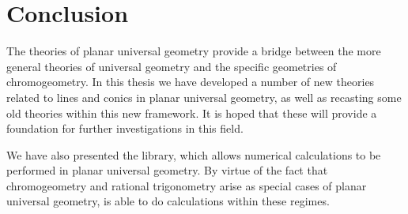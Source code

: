 




\chapter{Conclusion}

The theories of planar universal geometry provide a bridge between the more general theories of universal geometry and the specific geometries of chromogeometry.
In this thesis we have developed a number of new theories related to lines and conics in planar universal geometry, as well as recasting some old theories within this new framework.
It is hoped that these will provide a foundation for further investigations in this field.

We have also presented the \pygeom library, which allows numerical calculations to be performed in planar universal geometry.
By virtue of the fact that chromogeometry and rational trigonometry arise as special cases of planar universal geometry, \pygeom is able to do calculations within these regimes.

